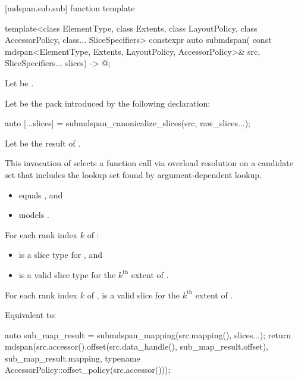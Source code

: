 [mdspan.sub.sub]{ function template}

%
\begin{itemdecl}
template<class ElementType, class Extents, class LayoutPolicy,
         class AccessorPolicy, class... SliceSpecifiers>
  constexpr auto submdspan(
    const mdspan<ElementType, Extents, LayoutPolicy, AccessorPolicy>& src,
    SliceSpecifiers... slices) -> @\seebelow@;
\end{itemdecl}

\begin{itemdescr}
\pnum
Let  be .

\pnum
Let  be the pack introduced by the following declaration:
\begin{codeblock}
auto [...slices] = submdspan_canonicalize_slices(src, raw_slices...);
\end{codeblock}

\pnum
Let  be the result of
.
\begin{note}
This invocation of 
selects a function call via overload resolution
on a candidate set that includes the lookup set
found by argument-dependent lookup.
\end{note}

\pnum
\constraints
\begin{itemize}
\item
{} equals , and
\item
{} models .
\end{itemize}

\pnum
\mandates
For each rank index $k$ of :
\begin{itemize}
\item
   is a  slice type
  for , and
\item
   is a valid  slice type
  for the $k^\text{th}$ extent of .
\end{itemize}

\pnum
\expects
For each rank index $k$ of ,
 is a valid  slice
for the $k^\text{th}$ extent of .

\pnum
\effects
Equivalent to:
\begin{codeblock}
auto sub_map_result = submdspan_mapping(src.mapping(), slices...);
return mdspan(src.accessor().offset(src.data_handle(), sub_map_result.offset),
              sub_map_result.mapping,
              typename AccessorPolicy::offset_policy(src.accessor()));
\end{codeblock}
\end{itemdescr}

